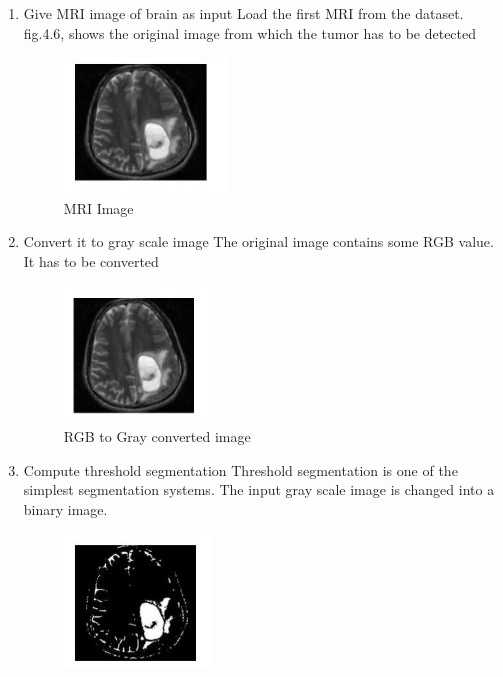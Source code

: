    
   \begin{enumerate}
       \item Give MRI image of brain as input
            Load the first MRI from the dataset. fig.4.6, shows the original image from which the tumor has to be detected  
        
            \begin{figure}[h!]
                 \centering
                 \includegraphics[scale=0.5]{Figures/11.png}
                 \caption{MRI Image}
                 \label{fig:my_label}
           \end{figure}
        \item Convert it to gray scale image
            The original image contains some RGB value. It has to be converted
            \begin{figure}[h!]
                \centering
                \includegraphics[scale=0.5]{Chapters/12.png}
                \caption{RGB to Gray converted image}
                \label{fig:RGB to Gray converted image}
            \end{figure}
        \item Compute threshold segmentation
            Threshold segmentation is one of the simplest segmentation systems. The input gray scale image is changed into a binary image.
            \begin{figure}[h!]
                \centering
                \includegraphics[scale=0.5]{Figures/13.png}

\end{figure}
\end{enumerate}
